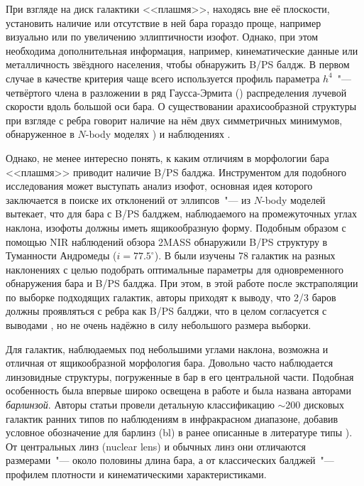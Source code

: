 \documentclass{trlnotes}
\begin{document}
При взгляде на диск галактики <<плашмя>>, находясь вне её плоскости, установить наличие
или отсутствие в ней бара гораздо проще, например визуально или по увеличению эллиптичности изофот. Однако, при
этом необходима дополнительная информация, например, кинематические данные или металличность звёздного населения,
чтобы обнаружить B/PS балдж. В первом случае в качестве критерия чаще всего используется профиль параметра
$h^4$~"---  четвёртого члена в разложении в ряд Гаусса-Эрмита (\cite{vandermarel1993}) распределения лучевой
скорости вдоль большой оси бара. О существовании арахисообразной структуры при взгляде с ребра говорит наличие на
нём двух симметричных минимумов, обнаруженное в $N$-body моделях \citep{debattista2005,iannuzzi2015}) и наблюдениях \citep{mendez-abreu2008}.

Однако, не менее интересно понять, к каким отличиям в морфологии бара <<плашмя>> приводит наличие B/PS балджа. 
Инструментом для подобного исследования может выступать анализ изофот, основная идея которого заключается в поиске
их отклонений  от эллипсов~"--- из $N$-body моделей вытекает, что для бара с B/PS балджем,
наблюдаемого на промежуточных углах наклона, изофоты должны иметь ящикообразную форму. Подобным образом с помощью NIR наблюдений обзора 2MASS  \citet{beaton2007} обнаружили B/PS структуру в Туманности Андромеды ($i = 77.5^\circ$). 
В \citet{erwin2013} были изучены 78 галактик на разных наклонениях с целью подобрать оптимальные параметры для
одновременного обнаружения бара и B/PS балджа. При этом, в этой работе после экстраполяции по выборке
подходящих галактик, авторы приходят к выводу, что 2/3 баров должны проявляться с ребра как B/PS балджи, что в
целом согласуется с выводами \citet{lutticke2000a}, но не очень надёжно в силу небольшого размера выборки.

Для галактик, наблюдаемых под небольшими углами наклона, возможна и отличная от ящикообразной морфология бара.
Довольно часто наблюдается линзовидные структуры, погруженные в бар в его центральной части. Подобная особенность
была впервые широко освещена в работе \citet{laurikainen2011} и была названа авторами \emph{барлинзой}.
Авторы статьи провели детальную классификацию $\sim\!200$ дисковых галактик ранних типов по наблюдениям в
инфракрасном диапазоне, добавив условное обозначение для барлинз (bl) в ранее описанные в литературе типы
\citep{devaucouleurs1959,buta2010}). От центральных линз (nuclear lens) и обычных линз они отличаются
размерами~"--- около половины длина бара, а от классических балджей~"--- профилем плотности и кинематическими
характеристиками. 
\end{document}
